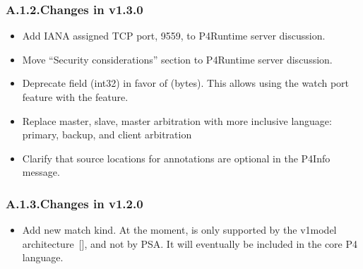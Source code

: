 \documentclass[11pt]{article}
\begin{document}
{%
\subsubsection{A.1.2.\hspace*{0.5em}Changes in v1.3.0}\label{sec-changes-in-v130}%

\begin{itemize}[noitemsep,topsep=\mdcompacttopsep]%

\item{}Add IANA assigned TCP port, 9559, to P4Runtime server discussion.%

\item{}Move \textquotedblleft{}Security considerations\textquotedblright{} section to P4Runtime server discussion.%

\item{}Deprecate  field (int32) in favor of  (bytes). This allows
using the watch port feature with the  feature.%

\item{}Replace master, slave, master arbitration with more inclusive language:
primary, backup, and client arbitration%

\item{}Clarify that source locations for annotations are optional in the P4Info
message.%
\end{itemize}%

\subsubsection{A.1.3.\hspace*{0.5em}Changes in v1.2.0}\label{sec-changes-in-v120}%

\begin{itemize}[noitemsep,topsep=\mdcompacttopsep]%

\item{}Add new  match kind. At the moment,  is only supported by
the v1model architecture~[], and not by PSA. It will eventually be
included in the core P4 language.%


\end{itemize}}
\end{document}
